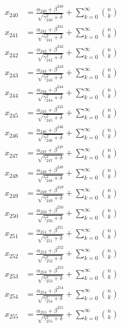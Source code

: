\documentclass{article}
\begin{document}
\begin{align}
  x_{240} &= \frac{\alpha_{240} + \beta^{240}}{\sqrt{\gamma_{240}^2 + \delta}} + \sum_{k=0}^{\infty} \binom{n}{k} \label{eq:240} \\
  x_{241} &= \frac{\alpha_{241} + \beta^{241}}{\sqrt{\gamma_{241}^2 + \delta}} + \sum_{k=0}^{\infty} \binom{n}{k} \label{eq:241} \\
  x_{242} &= \frac{\alpha_{242} + \beta^{242}}{\sqrt{\gamma_{242}^2 + \delta}} + \sum_{k=0}^{\infty} \binom{n}{k} \label{eq:242} \\
  x_{243} &= \frac{\alpha_{243} + \beta^{243}}{\sqrt{\gamma_{243}^2 + \delta}} + \sum_{k=0}^{\infty} \binom{n}{k} \label{eq:243} \\
  x_{244} &= \frac{\alpha_{244} + \beta^{244}}{\sqrt{\gamma_{244}^2 + \delta}} + \sum_{k=0}^{\infty} \binom{n}{k} \label{eq:244} \\
  x_{245} &= \frac{\alpha_{245} + \beta^{245}}{\sqrt{\gamma_{245}^2 + \delta}} + \sum_{k=0}^{\infty} \binom{n}{k} \label{eq:245} \\
  x_{246} &= \frac{\alpha_{246} + \beta^{246}}{\sqrt{\gamma_{246}^2 + \delta}} + \sum_{k=0}^{\infty} \binom{n}{k} \label{eq:246} \\
  x_{247} &= \frac{\alpha_{247} + \beta^{247}}{\sqrt{\gamma_{247}^2 + \delta}} + \sum_{k=0}^{\infty} \binom{n}{k} \label{eq:247} \\
  x_{248} &= \frac{\alpha_{248} + \beta^{248}}{\sqrt{\gamma_{248}^2 + \delta}} + \sum_{k=0}^{\infty} \binom{n}{k} \label{eq:248} \\
  x_{249} &= \frac{\alpha_{249} + \beta^{249}}{\sqrt{\gamma_{249}^2 + \delta}} + \sum_{k=0}^{\infty} \binom{n}{k} \label{eq:249} \\
  x_{250} &= \frac{\alpha_{250} + \beta^{250}}{\sqrt{\gamma_{250}^2 + \delta}} + \sum_{k=0}^{\infty} \binom{n}{k} \label{eq:250} \\
  x_{251} &= \frac{\alpha_{251} + \beta^{251}}{\sqrt{\gamma_{251}^2 + \delta}} + \sum_{k=0}^{\infty} \binom{n}{k} \label{eq:251} \\
  x_{252} &= \frac{\alpha_{252} + \beta^{252}}{\sqrt{\gamma_{252}^2 + \delta}} + \sum_{k=0}^{\infty} \binom{n}{k} \label{eq:252} \\
  x_{253} &= \frac{\alpha_{253} + \beta^{253}}{\sqrt{\gamma_{253}^2 + \delta}} + \sum_{k=0}^{\infty} \binom{n}{k} \label{eq:253} \\
  x_{254} &= \frac{\alpha_{254} + \beta^{254}}{\sqrt{\gamma_{254}^2 + \delta}} + \sum_{k=0}^{\infty} \binom{n}{k} \label{eq:254} \\
  x_{255} &= \frac{\alpha_{255} + \beta^{255}}{\sqrt{\gamma_{255}^2 + \delta}} + \sum_{k=0}^{\infty} \binom{n}{k} \label{eq:255} \\

\end{align}
\end{document}
